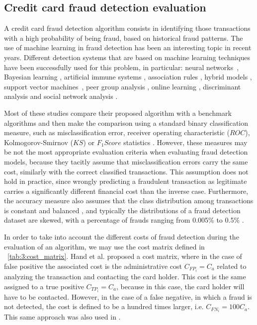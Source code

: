   
\subsection{Credit card fraud detection evaluation}
\label{sec:4:frad:eval}

  A credit card fraud detection algorithm consists in identifying those transactions with a 
  high probability of being fraud, based on historical fraud patterns. The use of machine learning 
  in fraud detection has been an interesting topic in recent years. Different detection systems 
  that are based on machine learning  techniques have been successfully   used for this problem, in 
  particular: neural networks~\citep{Maes2002}, Bayesian learning \citep{Maes2002}, artificial 
  immune systems \citep{Gadi2008}, association rules \citep{Sanchez2009}, hybrid models 
  \citep{Krivko2010}, support vector machines~\citep{Bhattacharyya2011}, peer group  analysis 
  \citep{Weston2008}, online learning   
\citep{DalPozzolo2014}, discriminant analysis \citep{Mahmoudi2015} and social network analysis 
\citep{VanVlasselaer2015a}.
 
  Most of these studies compare their proposed algorithm with a benchmark algorithms and then make 
  the comparison using a standard binary classification measure, such as misclassification error, 
  receiver operating characteristic ($ROC$), Kolmogorov-Smirnov ($KS$) or \mbox{$F_1Score$} 
  statistics \citep{Bolton2002,Hand2007a,DalPozzolo2014}. 
  However, these measures may be not the most appropriate evaluation criteria when  evaluating 
  fraud detection models, because they tacitly assume that misclassification errors carry the same 
  cost, similarly with the correct classified transactions. This assumption does not hold in 
  practice, since  wrongly predicting a fraudulent transaction as legitimate carries a 
  significantly different financial cost than the inverse case. Furthermore, the accuracy measure 
  also assumes that the class distribution among transactions is constant and balanced 
  \citep{Provost1998}, and typically the distributions of a fraud detection dataset are skewed, 
  with a percentage of frauds ranging from 0.005\% to 0.5\% \citep{Gadi2008,Bhattacharyya2011}.
  
	In order to take into account the different costs of fraud detection during the evaluation of an 
	algorithm, we may use the cost matrix defined in \tablename{~\ref{tab:3:cost_matrix}}.
  Hand et al. \citep{Hand2007a} proposed a cost matrix, where in the case of false positive the 
  associated  cost is the administrative cost $C_{FP_i}=C_a$ related to analyzing the transaction 
  and contacting  the card holder. This cost is the same assigned to a true positive 
  $C_{TP_i}=C_a$, because in  this case,  the card holder will have to be contacted. However, in 
  the case of a false negative, in which a  fraud is  not detected, the cost is defined to be a 
  hundred times larger, i.e. $C_{FN_i}=100C_a$. This same approach was also used in 
  \citep{Gadi2008}.


